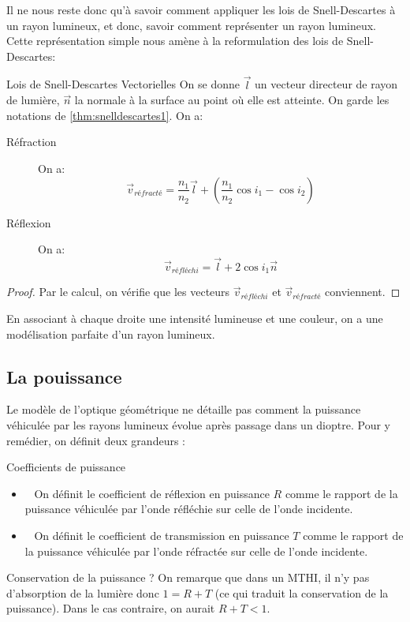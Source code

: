 \documentclass{classe}
\begin{document}
Il ne nous reste donc qu'à savoir comment appliquer les lois de Snell-Descartes à un rayon lumineux, et donc, savoir comment représenter un rayon lumineux.
Cette représentation simple nous amène à la reformulation des lois de Snell-Descartes:
\begin{propositionfr}{Lois de Snell-Descartes Vectorielles}
	On se donne $\overrightarrow{l}$ un vecteur directeur de rayon de lumière, $\vec{n}$ la normale à la surface au point où elle est atteinte.
	On garde les notations de \ref{thm:snelldescartes1}.
	On a:
	\begin{description}
		\item[Réfraction] On a:
			\begin{equation}
				\vec{v}_{réfracté} = \frac{n_{1}}{n_{2}}\vec{l} + \left(\frac{n_{1}}{n_{2}}\cos i_{1} - \cos i_{2}\right)
				\label{snelldescartesrefraction}
			\end{equation}
		\item[Réflexion] On a:
			\begin{equation}
				\vec{v}_{réfléchi} = \vec{l} + 2\cos i_{1}\vec{n}
				\label{snelldescartesreflexion}
			\end{equation}
	\end{description}
\end{propositionfr}
\begin{proof}
	Par le calcul, on vérifie que les vecteurs $\vec{v}_{réfléchi}$ et $\vec{v}_{réfracté}$ conviennent.
\end{proof}
En associant à chaque droite une intensité lumineuse et une couleur, on a une modélisation parfaite d'un rayon lumineux.

\subsection{La pouissance}

Le modèle de l'optique géométrique ne détaille pas comment la puissance véhiculée par les rayons lumineux évolue après passage dans un dioptre. Pour y remédier, on définit deux grandeurs :
\begin{définition}{Coefficients de puissance}{}
	\begin{itemize}
		\item \color{vulm}{Coefficient en réflexion}\ \color{black} On définit le coefficient de réflexion en puissance $R$ comme le rapport de la puissance véhiculée par l'onde réfléchie sur celle de l'onde incidente.
		\item \color{vulm}{Coefficient en transmission}\ \color{black} On définit le coefficient de transmission en puissance $T$ comme le rapport de la puissance véhiculée par l'onde réfractée sur celle de l'onde incidente.
	\end{itemize}
\end{définition}
\begin{remarque}{Conservation de la puissance ?}{}
	On remarque que dans un MTHI, il n'y pas d'absorption de la lumière donc $1 = R + T$ (ce qui traduit la conservation de la puissance). Dans le cas contraire, on aurait $R + T < 1$.
\end{remarque}
\end{document}

